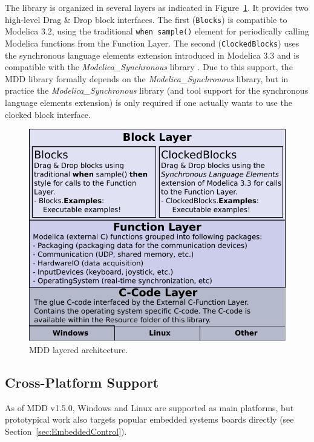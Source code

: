 \documentclass{resources/modelica}
\newcommand{\modelica}[1]{\lstinline[language=modelica]|#1|}
\begin{document}
The library is organized in several layers as indicated in
Figure~\ref{fig:MDDLayeredArchitecture}. It
provides two high-level Drag \& Drop block interfaces. The first (\texttt{Blocks}) is
compatible to Modelica 3.2, using the traditional \modelica{when sample()}
element for periodically calling Modelica functions from the \textsf{Function Layer}. The second
(\texttt{ClockedBlocks}) uses the synchronous language elements extension
introduced in Modelica 3.3 and is compatible with the
\emph{Modelica\_Synchronous} library \citep{Otter2012}. Due to this support, the
MDD library formally depends on the \emph{Modelica\_Synchronous} library, but in
practice the \emph{Modelica\_Synchronous} library (and tool support for the
synchronous language elements extension) is only required if one actually wants
to use the clocked block interface.
\begin{figure}[htb]
\begin{center}
  \includegraphics[width=\columnwidth]{figures/MDDLayeredArchitecture}
  \caption{MDD layered architecture.}
  \label{fig:MDDLayeredArchitecture}
\end{center}
\end{figure}

\subsection{Cross-Platform Support}
\label{sec:CrossPlatformSupport}

As of MDD v1.5.0, Windows and Linux are supported as main platforms,
but prototypical work also targets popular embedded systems boards directly (see
Section~\ref{sec:EmbeddedControl}).
\end{document}

